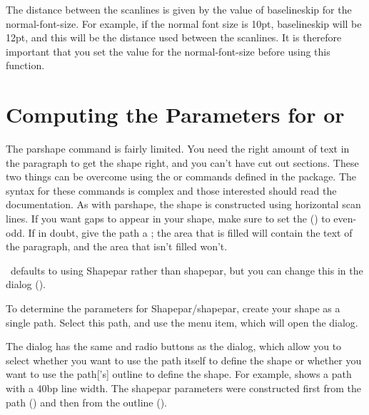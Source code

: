 The distance between the scanlines is given by the
value of \gls{baselineskip} for the \gls{normal-font-size}.
For example, if the normal font size is 10\gls{pt}, \gls{baselineskip}
will be 12pt, and this will be the distance used between
the scanlines. It is therefore important that you set the value
for the \gls{normal-font-size} before using this function.


\section{Computing the Parameters for  or
}
\label{sec:shapepar}


The \gls{parshape} command is fairly limited. You need the right
amount of text in the paragraph to get the shape right, and you
can't have cut out sections. These two things can be overcome using
the  or  commands
defined in the  package. The syntax for these commands
is complex and those interested should read the 
documentation. As with \gls{parshape}, the shape is constructed
using horizontal scan lines. If you want gaps to appear in your
shape, make sure to set the 
() to even-odd.  If in doubt, give the
\gls{path} a ; the area that is filled will
contain the text of the paragraph, and the area that isn't filled
won't.

\begin{information}
\FlowframTk\ defaults to using \gls{Shapepar} rather than
\gls{shapepar}, but you can change this in the
 dialog ().
\end{information}

To determine the parameters for \gls{Shapepar}\slash\gls{shapepar}, create
your shape as a single \gls*{path}. Select this \gls*{path}, and use
the  menu item, which will open the
 dialog.


The  dialog has the same 
and  radio buttons as the
 dialog, which allow you to select
whether you want to use the \gls*{path} itself to define the shape
or whether you want to use the \gls*{path}['s] outline to define the shape.
For example,  shows a \gls*{path} with a
40bp line width. The \gls{shapepar} parameters were constructed
first from the \gls*{path} () and then from
the outline ().

